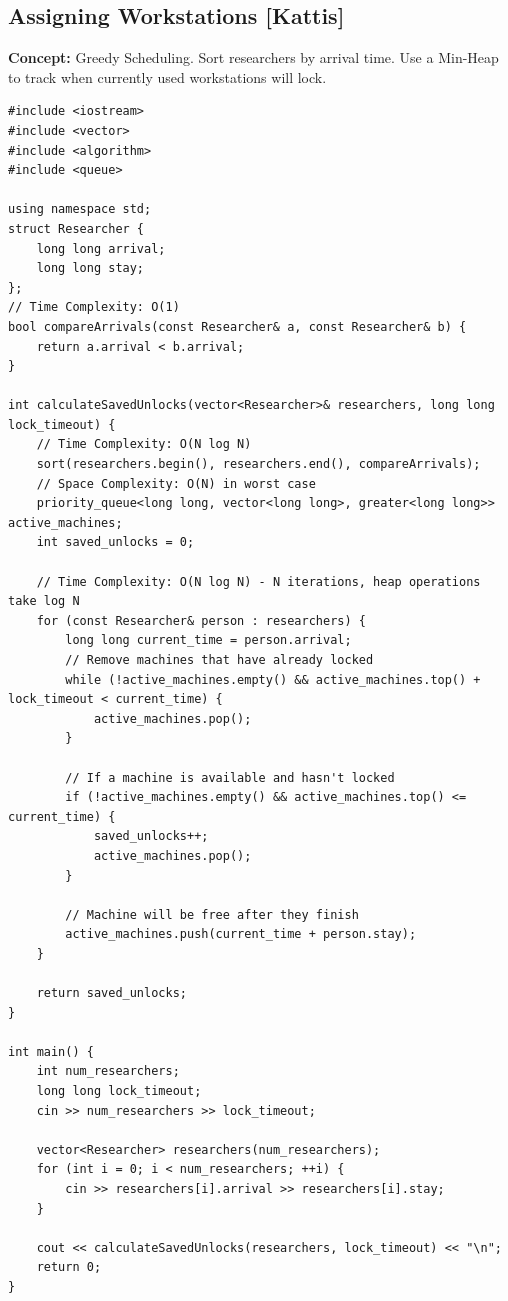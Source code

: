 \subsection{Assigning Workstations [Kattis]}
\textbf{Concept:} Greedy Scheduling. Sort researchers by arrival time. Use a Min-Heap to track when currently used workstations will lock.
\begin{lstlisting}
#include <iostream>
#include <vector>
#include <algorithm>
#include <queue>

using namespace std;
struct Researcher {
    long long arrival;
    long long stay;
};
// Time Complexity: O(1)
bool compareArrivals(const Researcher& a, const Researcher& b) {
    return a.arrival < b.arrival;
}

int calculateSavedUnlocks(vector<Researcher>& researchers, long long lock_timeout) {
    // Time Complexity: O(N log N)
    sort(researchers.begin(), researchers.end(), compareArrivals);
    // Space Complexity: O(N) in worst case
    priority_queue<long long, vector<long long>, greater<long long>> active_machines;
    int saved_unlocks = 0;
    
    // Time Complexity: O(N log N) - N iterations, heap operations take log N
    for (const Researcher& person : researchers) {
        long long current_time = person.arrival;
        // Remove machines that have already locked
        while (!active_machines.empty() && active_machines.top() + lock_timeout < current_time) {
            active_machines.pop();
        }
        
        // If a machine is available and hasn't locked
        if (!active_machines.empty() && active_machines.top() <= current_time) {
            saved_unlocks++;
            active_machines.pop();
        }
        
        // Machine will be free after they finish
        active_machines.push(current_time + person.stay);
    }
    
    return saved_unlocks;
}

int main() {
    int num_researchers;
    long long lock_timeout;
    cin >> num_researchers >> lock_timeout;
    
    vector<Researcher> researchers(num_researchers);
    for (int i = 0; i < num_researchers; ++i) {
        cin >> researchers[i].arrival >> researchers[i].stay;
    }
    
    cout << calculateSavedUnlocks(researchers, lock_timeout) << "\n";
    return 0;
}
\end{lstlisting}

